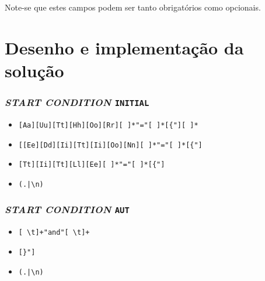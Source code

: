 Note-se que estes campos podem ser tanto obrigatórios como opcionais.



\section{Desenho e implementação da solução}
\label{sec:des:b2}

\subsubsection{\emph{START CONDITION} \texttt{INITIAL}}

\begin{itemize}
\item 

\begin{verbatim}
[Aa][Uu][Tt][Hh][Oo][Rr][ ]*"="[ ]*[{"][ ]*
\end{verbatim}

\item 

\begin{verbatim}
[[Ee][Dd][Ii][Tt][Ii][Oo][Nn][ ]*"="[ ]*[{"]
\end{verbatim}

\item 
\begin{verbatim}
[Tt][Ii][Tt][Ll][Ee][ ]*"="[ ]*[{"]
\end{verbatim}


\item 
\begin{verbatim}
(.|\n)
\end{verbatim}

\end{itemize}


\subsubsection{\emph{START CONDITION} \texttt{AUT}}

\begin{itemize}
\item 
\begin{verbatim}
[ \t]+"and"[ \t]+
\end{verbatim}

\item 
\begin{verbatim}
[}"]
\end{verbatim}

\item 
\begin{verbatim}
(.|\n)
\end{verbatim}

\end{itemize}

